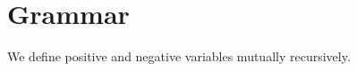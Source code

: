 \section{Grammar}

We define positive and negative variables mutually recursively.

\begin{definition}[Terms]
\ottgrammartabular{
\ottP\ottinterrule
\ottN\ottinterrule
}
\end{definition}